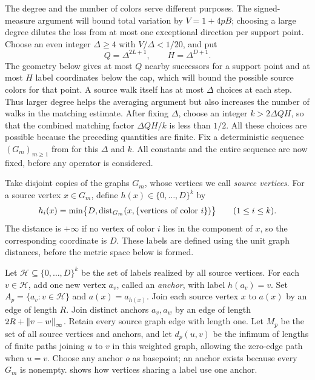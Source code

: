 The degree and the number of colors serve different purposes. The
signed-measure argument will bound total variation by $V=1+4pB$; choosing
a large degree dilutes the loss from at most one exceptional direction per
support point. Choose an even integer $\Delta\ge4$ with $V/\Delta<1/20$,
and put
\[
 Q=\Delta^{2L+1},\qquad H=\Delta^{D+1}.
\]
The geometry below gives at most $Q$ nearby successors for a support point
and at most $H$ label coordinates below the cap, which will bound the
possible source colors for that point. A source walk itself has at most
$\Delta$ choices at each step. Thus larger degree helps the averaging
argument but also increases the number of walks in the matching estimate.
After fixing $\Delta$, choose an integer $k>2\Delta QH$, so that the
combined matching factor $\Delta QH/k$ is less than $1/2$. All these
choices are possible because the preceding quantities are finite.
Fix a deterministic sequence $(G_m)_{m\ge1}$ from
 for this $\Delta$ and $k$. All constants and the
entire sequence are now fixed, before any operator is considered.

Take disjoint copies of the graphs $G_m$, whose vertices we call
\emph{source vertices}. For a source vertex $x\in G_m$, define
$h(x)\in\{0,\ldots,D\}^k$ by
\[
 h_i(x)=\min\bigl\{D,\operatorname{dist}_{G_m}(x,\{\text{vertices of color }i\})\bigr\}
 \qquad(1\le i\le k).
\]
The distance is $+\infty$ if no vertex of color $i$ lies in the component
of $x$, so the corresponding coordinate is $D$. These labels are defined
using the unit graph distances, before the metric space below is formed.

Let $\mathcal H\subseteq\{0,\ldots,D\}^k$ be the set of labels realized by
all source vertices. For each $v\in\mathcal H$, add one new vertex $a_v$,
called an \emph{anchor}, with label $h(a_v)=v$. Set
$A_p=\{a_v:v\in\mathcal H\}$ and $a(x)=a_{h(x)}$. Join each source vertex
$x$ to $a(x)$ by an edge of length $R$. Join distinct anchors $a_v,a_w$
by an edge of length $2R+\left\|v-w\right\|_\infty$. Retain every source graph edge
with length one. Let $M_p$ be the set of all source vertices and anchors,
and let $d_p(u,v)$ be the infimum of lengths of finite paths joining $u$
to $v$ in this weighted graph, allowing the zero-edge path when $u=v$.
Choose any anchor $o$ as basepoint; an anchor exists because every $G_m$ is
nonempty.  shows how vertices sharing a label use one anchor.

